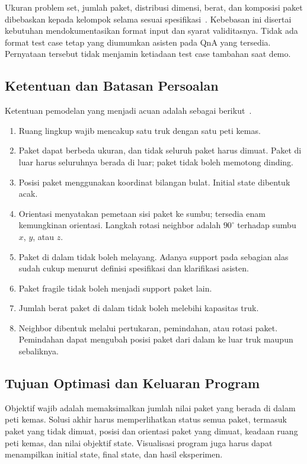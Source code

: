 Ukuran problem set, jumlah paket, distribusi dimensi, berat, dan komposisi paket
dibebaskan kepada kelompok selama sesuai spesifikasi~\cite{qna}. Kebebasan ini
disertai kebutuhan mendokumentasikan format input dan syarat validitasnya.
Tidak ada format test case tetap yang diumumkan asisten pada QnA yang tersedia.
Pernyataan tersebut tidak menjamin ketiadaan test case tambahan saat demo.

\subsection{Ketentuan dan Batasan Persoalan}
Ketentuan pemodelan yang menjadi acuan adalah sebagai berikut~\cite{spesifikasi,qna}.
\begin{enumerate}
\item Ruang lingkup wajib mencakup satu truk dengan satu peti kemas.
\item Paket dapat berbeda ukuran, dan tidak seluruh paket harus dimuat.
      Paket di luar harus seluruhnya berada di luar; paket tidak boleh memotong dinding.
\item Posisi paket menggunakan koordinat bilangan bulat. Initial state dibentuk acak.
\item Orientasi menyatakan pemetaan sisi paket ke sumbu; tersedia enam kemungkinan
      orientasi. Langkah rotasi neighbor adalah $90^\circ$ terhadap sumbu $x$, $y$, atau $z$.
\item Paket di dalam tidak boleh melayang. Adanya support pada sebagian alas
      sudah cukup menurut definisi spesifikasi dan klarifikasi asisten.
\item Paket fragile tidak boleh menjadi support paket lain.
\item Jumlah berat paket di dalam tidak boleh melebihi kapasitas truk.
\item Neighbor dibentuk melalui pertukaran, pemindahan, atau rotasi paket.
      Pemindahan dapat mengubah posisi paket dari dalam ke luar truk maupun sebaliknya.
\end{enumerate}

\subsection{Tujuan Optimasi dan Keluaran Program}
Objektif wajib adalah memaksimalkan jumlah nilai paket yang berada di dalam
peti kemas. Solusi akhir harus memperlihatkan status semua paket, termasuk
paket yang tidak dimuat, posisi dan orientasi paket yang dimuat, keadaan ruang
peti kemas, dan nilai objektif state. Visualisasi program juga harus dapat
menampilkan initial state, final state, dan hasil eksperimen.

